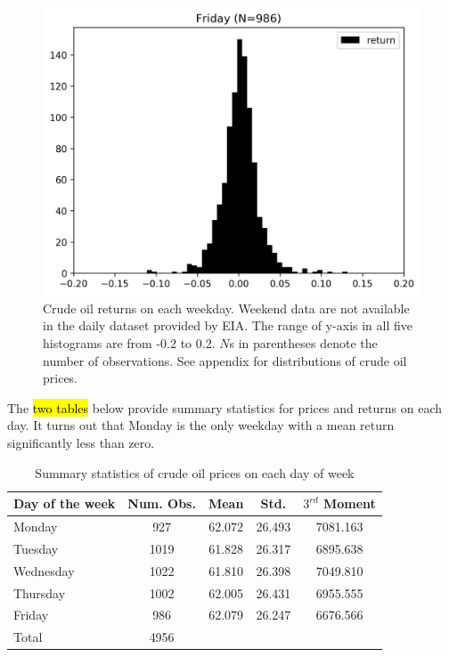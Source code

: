 \documentclass[12pt]{article}
\begin{document}
\begin{figure}[H]
		\includegraphics[width=0.45\linewidth]{figures/day_of_week_effect/dist_returns_Friday.png}
		\caption{Crude oil returns on each weekday. Weekend data are not available in the daily dataset provided by EIA. The range of y-axis in all five histograms are from -0.2 to 0.2. $N$s in parentheses denote the number of observations. See appendix for distributions of crude oil prices.}
	\end{figure}

	\par The \hl{two tables} below provide summary statistics for prices and returns on each day. It turns out that Monday is the only weekday with a mean return significantly less than zero.
	\begin{table}[H]
		\small
		\center
		\begin{tabular}{|l|c c c c|}
			\hline
			Day of the week & Num. Obs. & Mean & Std. & $3^{rd}$ Moment \\
			\hline
			Monday & 927 & 62.072 & 26.493 & 7081.163 \\
			Tuesday & 1019 & 61.828 & 26.317 & 6895.638 \\
			Wednesday & 1022 & 61.810 & 26.398 & 7049.810 \\
			Thursday & 1002 & 62.005 & 26.431 & 6955.555 \\
			Friday & 986 & 62.079 & 26.247 & 6676.566 \\
			\hline
			Total & 4956 & & & \\
			\hline
		\end{tabular}
		\caption{Summary statistics of crude oil prices on each day of week}
	\end{table}
\end{document}
